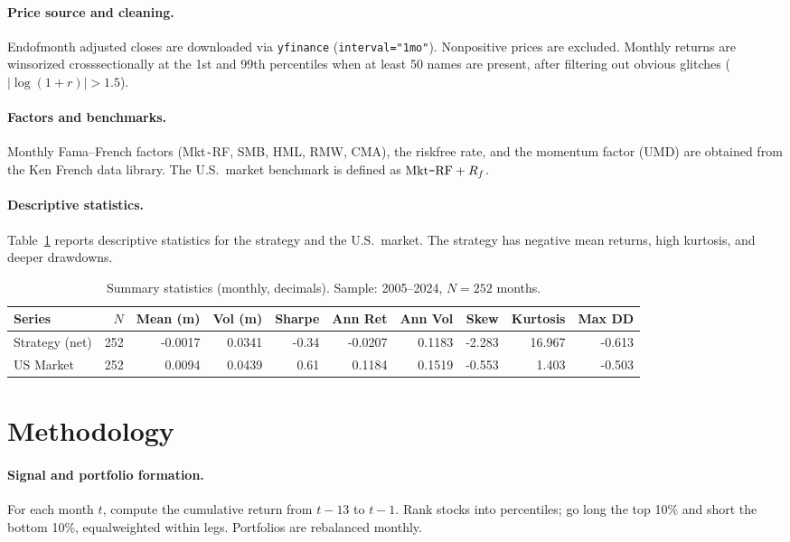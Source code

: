 \documentclass[11pt]{article}
\begin{document}
\paragraph{Price source and cleaning.}
End\textendash of\textendash month adjusted closes are downloaded via \texttt{yfinance} (\texttt{interval="1mo"}). Nonpositive prices are excluded. Monthly returns are winsorized cross\textendash sectionally at the 1st and 99th percentiles when at least 50 names are present, after filtering out obvious glitches (\(|\log(1+r)|>1.5\)).

\paragraph{Factors and benchmarks.}
Monthly Fama--French factors (Mkt\texttt{-}RF, SMB, HML, RMW, CMA), the risk\textendash free rate, and the momentum factor (UMD) are obtained from the Ken French data library. The U.S.\ market benchmark is defined as \( \text{Mkt\texttt{-}RF} + R_f \).

\paragraph{Descriptive statistics.}
Table~\ref{tab:summary} reports descriptive statistics for the strategy and the U.S.\ market. The strategy has negative mean returns, high kurtosis, and deeper drawdowns.

\begin{table}[!ht]
\centering
\caption{Summary statistics (monthly, decimals). Sample: 2005--2024, \(N{=}252\) months.}
\label{tab:summary}
\begin{tabular}{lrrrrrrrrr}
\toprule
Series & $N$ & Mean (m) & Vol (m) & Sharpe & Ann Ret & Ann Vol & Skew & Kurtosis & Max DD \\
\midrule
Strategy (net) & 252 & -0.0017 & 0.0341 & -0.34 & -0.0207 & 0.1183 & -2.283 & 16.967 & -0.613 \\
US Market      & 252 & \phantom{-}0.0094 & 0.0439 & \phantom{-}0.61 & \phantom{-}0.1184 & 0.1519 & -0.553 & \phantom{-}1.403 & -0.503 \\
\bottomrule
\end{tabular}
\end{table}

\section{Methodology} \label{sec:method}
\paragraph{Signal and portfolio formation.}
For each month \(t\), compute the cumulative return from \(t{-}13\) to \(t{-}1\). Rank stocks into percentiles; go long the top 10\% and short the bottom 10\%, equal\textendash weighted within legs. Portfolios are rebalanced monthly.
\end{document}
